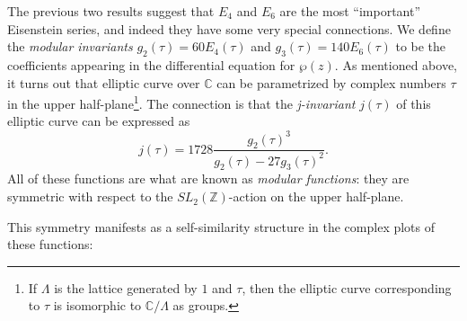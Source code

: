 \documentclass[12pt,reqno]{amsart}
\theoremstyle{plain}
\numberwithin{equation}{section}
\begin{document}
The previous two results suggest that $E_4$ and $E_6$ are the most ``important'' Eisenstein series, and indeed they have some very special connections. We define the \textit{modular invariants} $g_2(\tau) = 60E_4(\tau)$ and $g_3(\tau) = 140E_6(\tau)$ to be the coefficients appearing in the differential equation for $\wp(z)$. As mentioned above, it turns out that elliptic curve over $\mathbb C$ can be parametrized by complex numbers $\tau$ in the upper half-plane\footnote{If $\Lambda$ is the lattice generated by $1$ and $\tau$, then the elliptic curve corresponding to $\tau$ is isomorphic to $\mathbb C/\Lambda$ as groups.}. The connection is that the \textit{j-invariant} $j(\tau)$ of this elliptic curve can be expressed as
\[j(\tau) = 1728 \frac{g_2(\tau)^3}{g_2(\tau) - 27g_3(\tau)^2}.\]
All of these functions are what are known as \textit{modular functions}: they are symmetric with respect to the $SL_2(\mathbb Z)$-action on the upper half-plane. 


This symmetry manifests as a self-similarity structure in the complex plots of these functions:
\end{document}
